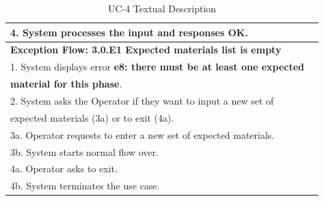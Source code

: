 \begin{table}[h]
\begin{center}
\begin{tabular}{|l|l|}
\\ 4. System processes the input and responses OK. \\ \hline
\textbf{Exception Flow: 3.0.E1 Expected materials list is empty}
\\ 1. System displays error \textbf{e8: there must be at least one expected} \\ \textbf{material for this phase}.
\\ 2. System asks the Operator if they want to input a new set of \\expected materials (3a) or to exit (4a).
\\ 3a. Operator requests to enter a new set of expected materials.
\\ 3b. System starts normal flow over.
\\ 4a. Operator asks to exit.
\\ 4b. System terminates the use case.\\ \hline
\end{tabular}
\end{center}
\caption {UC-4 Textual Description}
\label{tbl:uc4td}
\end{table}

